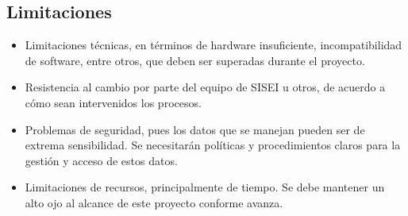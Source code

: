 \subsection{Limitaciones}
\begin{itemize}
	\item Limitaciones técnicas, en términos de hardware insuficiente, incompatibilidad de software, entre otros, que deben ser superadas durante el proyecto.
	\item Resistencia al cambio por parte del equipo de SISEI u otros, de acuerdo a cómo sean intervenidos los procesos.
	\item Problemas de seguridad, pues los datos que se manejan pueden ser de extrema sensibilidad. Se necesitarán políticas y procedimientos claros para la gestión y acceso de estos datos.
	\item Limitaciones de recursos, principalmente de tiempo. Se debe mantener un alto ojo al alcance de este proyecto conforme avanza.
\end{itemize}

\clearpage
